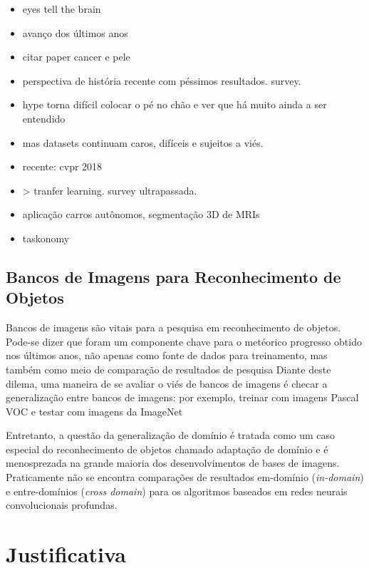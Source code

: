 \documentclass[
12pt, %
a4paper, %
onecolumn, %
]{article}
\begin{document}
\begin{itemize}

  \item eyes tell the brain 
  \item avanço dos últimos anos
  \item citar paper cancer e pele
  \item perspectiva de história recente com péssimos resultados. survey. 
  \item hype torna difícil colocar o pé no chão e ver que há muito ainda a ser entendido
  \item mas datasets continuam caros, difíceis e sujeitos a viés. 
  \item recente: cvpr 2018  \item> tranfer learning. survey ultrapassada.
  \item aplicação carros autônomos, segmentação 3D de MRIs
  \item taskonomy
\end{itemize}


\subsection{Bancos de Imagens para Reconhecimento de Objetos}

Bancos de imagens são vitais para a pesquisa em reconhecimento de objetos. Pode-se dizer que foram um componente chave para o metéorico progresso obtido nos últimos anos, não apenas como fonte de dados para treinamento, mas também como meio de comparação de resultados de pesquisa
Diante deste dilema, uma maneira de se avaliar o viés de bancos de imagens é checar a generalização entre bancos de imagens: por exemplo, treinar com imagens Pascal VOC e testar com imagens da ImageNet

Entretanto, a questão da generalização de domínio é tratada como um caso especial do reconhecimento de objetos chamado adaptação de domínio e é menosprezada na grande maioria dos desenvolvimentos de bases de imagens. Praticamente não se encontra comparações de resultados em-domínio (\textit{in-domain}) e entre-domínios (\textit{cross domain}) para os algoritmos baseados em redes neurais convolucionais profundas. 


\section{Justificativa}
\end{document}
